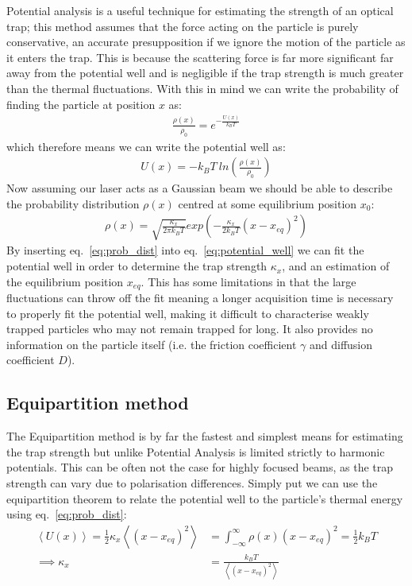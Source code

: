 Potential analysis is a useful technique for estimating the strength of an optical trap; this method assumes that the force acting on the particle is purely conservative, an accurate presupposition if we ignore the motion of the particle as it enters the trap. This is because the scattering force is far more significant far away from the potential well and is negligible if the trap strength is much greater than the thermal fluctuations. With this in mind we can write the probability of finding the particle at position $x$ as:
\begin{align}
	\frac{\rho(x)}{\rho_0} = e^{-\frac{U(x)}{k_{B}T}} 
\end{align}
which therefore means we can write the potential well as:
\begin{align}
	\label{eq:potential_well}
	U(x)=-k_BT\ ln\left(\frac{\rho(x)}{\rho_0} \right)
\end{align}
Now assuming our laser acts as a Gaussian beam we should be able to describe the probability distribution $\rho(x)$ centred at some equilibrium position $x_0$:
\begin{align}
	\label{eq:prob_dist}
	\rho(x)= \sqrt{\frac{\kappa_x}{2\pi k_BT}} exp\left(-\frac{\kappa_x}{2k_BT}(x-x_{eq})^2\right)
\end{align}
By inserting eq.~\ref{eq:prob_dist} into eq.~\ref{eq:potential_well} we can fit the potential well in order to determine the trap strength $\kappa_x$, and an estimation of the equilibrium position $x_{eq}$. This has some limitations in that the large fluctuations can throw off the fit meaning a longer acquisition time is necessary to properly fit the potential well, making it difficult to characterise weakly trapped particles who may not remain trapped for long. It also provides no information on the particle itself (i.e. the friction coefficient $\gamma$ and diffusion coefficient $D$).

\subsection{Equipartition method}
The Equipartition method is by far the fastest and simplest means for estimating the trap strength but unlike Potential Analysis is limited strictly to harmonic potentials. This can be often not the case for highly focused beams, as the trap strength can vary due to polarisation differences. Simply put we can use the equipartition theorem to relate the potential well to the particle's thermal energy using eq.~\ref{eq:prob_dist}:
\begin{align}
	\left<U(x)\right> = \frac{1}{2}\kappa_x\left<(x-x_{eq})^2\right> &= \int_{-\infty}^{\infty}\rho(x)(x-x_{eq})^2 = \frac{1}{2}k_BT \\
	\implies \kappa_x &= \frac{k_BT}{\left<(x-x_{eq})^2\right>} 
\end{align}

